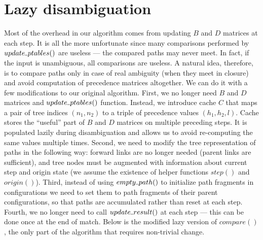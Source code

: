 \documentclass[AMA,STIX1COL]{WileyNJD-v2}
\newcommand{\Xund}{\rule{.4em}{.4pt}}
\begin{document}
\section{Lazy disambiguation}\label{section_lazy}

Most of the overhead in our algorithm comes from updating $B$ and $D$ matrices at each step.
It is all the more unfortunate since many comparisons performed by $update \Xund ptables ()$ are useless ---
the compared paths may never meet.
In fact, if the input is unambiguous, all comparisons are useless.
%
A natural idea, therefore, is to compare paths only in case of real ambiguity (when they meet in closure)
and avoid computation of precedence matrices altogether.
%
We can do it with a few modifications to our original algorithm.
%
First, we no longer need $B$ and $D$ matrices and $update \Xund ptables ()$ function.
Instead, we introduce cache $C$ that maps a pair of tree indices $(n_1, n_2)$ to a triple of precedence values $(h_1, h_2, l)$.
Cache stores the ``useful'' part of $B$ and $D$ matrices on multiple preceding steps.
It is populated lazily during disambiguation
and allows us to avoid re-computing the same values multiple times.
%
Second, we need to modify the tree representation of paths in the following way:
forward links are no longer needed (parent links are sufficient),
and tree nodes must be augmented with information about current step and origin state (we assume the existence of helper functions $step()$ and $origin()$).
%
Third, instead of using $empty \Xund path ()$ to initialize path fragments in configurations
we need to set them to path fragments of their parent configurations,
so that paths are accumulated rather than reset at each step.
%
Fourth, we no longer need to call $update \Xund result ()$ at each step --- this can be done once at the end of match.
%
Below is the modified lazy version of $compare()$, the only part of the algorithm that requires non-trivial change.
\\
\end{document}
